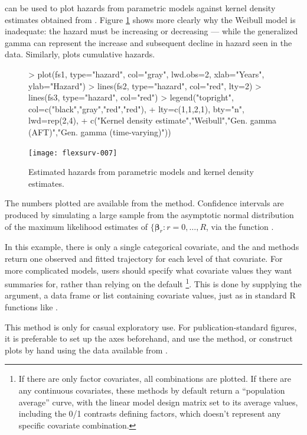 \documentclass[nojss,nofooter]{jss}
\begin{document}
 can be used to plot hazards from parametric
models against kernel density estimates obtained from 
\citep{muhaz,mueller:wang}. Figure \ref{fig:haz} shows more clearly why the Weibull
model is inadequate: the hazard must be increasing or decreasing ---
while the generalized gamma can represent the increase and subsequent
decline in hazard seen in the data.   Similarly,  plots cumulative hazards. 
\begin{figure}[h]
  \centering
\begin{Schunk}
\begin{Sinput}
> plot(fs1, type="hazard", col="gray", lwd.obs=2, xlab="Years", ylab="Hazard")
> lines(fs2, type="hazard", col="red", lty=2)
> lines(fs3, type="hazard", col="red")
> legend("topright", col=c("black","gray","red","red"),
+        lty=c(1,1,2,1),  bty="n", lwd=rep(2,4),
+        c("Kernel density estimate","Weibull","Gen. gamma (AFT)","Gen. gamma (time-varying)"))
\end{Sinput}
\end{Schunk}
\texttt{[image: flexsurv-007]}
  \caption{Estimated hazards from parametric models and kernel density estimates.}
  \label{fig:haz}
\end{figure}

The numbers plotted are available from the
 method.  Confidence intervals are
produced by simulating a large sample from the asymptotic normal
distribution of the maximum likelihood estimates of $\{\bm{\beta}_r:
r=0,\ldots,R$, via the function .

In this example, there is only a single categorical covariate, and the
 and  methods return one observed and fitted
trajectory for each level of that covariate.  For more complicated
models, users should specify what covariate values they
want summaries for, rather than relying on the default \footnote{If there are only factor covariates, all combinations are plotted.  If
there are any continuous covariates, these methods by default return a ``population average''
curve, with the linear model design matrix set to its average
values, including the 0/1 contrasts defining factors, which doesn't
represent any specific covariate combination.}.
This is done by supplying the  argument, a 
data frame or list containing covariate values, just as
in standard R functions like .

This  method is only for casual exploratory use.  For
publication-standard figures, it is preferable to set up the axes
beforehand, and use the  method, or construct plots by
hand using the data available from .
\end{document}
